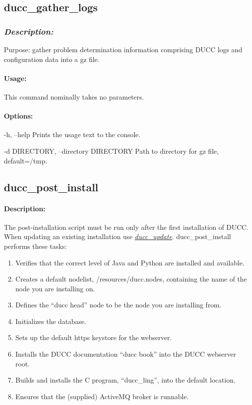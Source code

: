 \subsection{ducc\_gather\_logs}
\label{subsec:admin.ducc-gather-logs}
    \subsubsection{{\em Description:}}

    Purpose: gather problem determination information comprising DUCC logs and configuration data into a gz file.
    
    \paragraph{Usage:}
        This command nominally takes no parameters.
        
    \paragraph{Options:}
    \begin{description}
      	\item -h, --help      Prints the usage text to the console. 
      	\item -d DIRECTORY, --directory DIRECTORY     Path to directory for gz file, default=/tmp.
    \end{description}       
    

\subsection{ducc\_post\_install}
\label{subsec:admin.ducc-post-install}

    \paragraph{Description:}
    The post-installation script must be run only after the first installation of DUCC. 
    When updating an existing installation use \hyperref[subsec:admin.ducc-update]{\em ducc\_update}.
    ducc\_post\_install performs these tasks:
    \begin{enumerate}
      \item Verifies that the correct level of Java and Python are installed and available.
      \item Creates a default nodelist, \duccruntime/resources/ducc.nodes, containing the name of the node you are installing on.
      \item Defines the ``ducc head'' node to be the node you are installing from.
      \item Initializes the database.
      \item Sets up the default https keystore for the webserver.
      \item Installs the DUCC documentation ``ducc book'' into the DUCC webserver root.
      \item Builds and installs the C program, ``ducc\_ling'', into the default location.
      \item Ensures that the (supplied) ActiveMQ broker is runnable.
    \end{enumerate}

